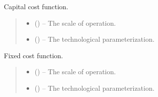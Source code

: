 \documentclass[letterpaper,10pt,english]{sphinxmanual}
\begin{document}
\begin{fulllineitems}
\label{\detokenize{technology:technology.utility_pv.capital_cost}}
\pysigstartsignatures
{}
\pysigstopsignatures
\sphinxAtStartPar
Capital cost function.
\begin{quote}\begin{description}
\begin{itemize}
\item {} 
\sphinxAtStartPar
{} () – The scale of operation.

\item {} 
\sphinxAtStartPar
{} () – The technological parameterization.

\end{itemize}

\end{description}\end{quote}

\end{fulllineitems}


\begin{fulllineitems}
\label{\detokenize{technology:technology.utility_pv.fixed_cost}}
\pysigstartsignatures
{}
\pysigstopsignatures
\sphinxAtStartPar
Fixed cost function.
\begin{quote}\begin{description}
\begin{itemize}
\item {} 
\sphinxAtStartPar
{} () – The scale of operation.

\item {} 
\sphinxAtStartPar
{} () – The technological parameterization.

\end{itemize}

\end{description}\end{quote}

\end{fulllineitems}
\end{document}
